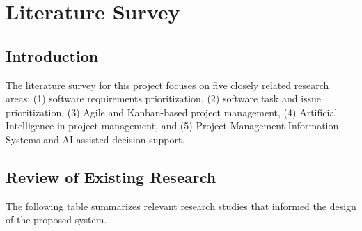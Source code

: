 \documentclass[12pt,a4paper,oneside]{report}
\begin{document}
\chapter{Literature Survey}

\section{Introduction}

The literature survey for this project focuses on five closely related research areas: (1) software requirements prioritization, (2) software task and issue prioritization, (3) Agile and Kanban-based project management, (4) Artificial Intelligence in project management, and (5) Project Management Information Systems and AI-assisted decision support.

\section{Review of Existing Research}

The following table summarizes relevant research studies that informed the design of the proposed system.
\end{document}
